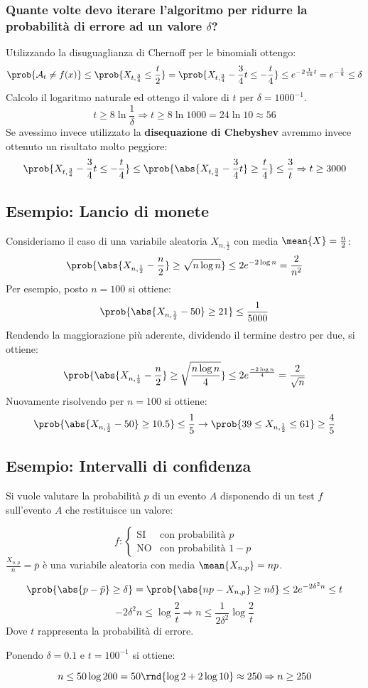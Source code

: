 \documentclass[\main/main.tex]{subfiles}
\begin{document}
\subsubsection{Quante volte devo iterare l'algoritmo per ridurre la probabilità di errore ad un valore \(\delta \)?}
Utilizzando la disuguaglianza di Chernoff per le binomiali ottengo:
\[
  \prob{\mathcal{A}_t \neq f(x)} \leq \prob{X_{t, \frac{3}{4}} \leq \frac{t}{2}} = \prob{X_{t,\frac{3}{4}} - \frac{3}{4}t \leq -\frac{t}{4}} \leq e^{-2\frac{1}{16}t} = e^{-\frac{1}{8}} \leq \delta
\]
Calcolo il logaritmo naturale ed ottengo il valore di \(t\) per \(\delta = 1000^{-1}\).
\[
  t \geq 8\ln{\frac{1}{\delta}} \Rightarrow t \geq 8 \ln{1000} = 24 \ln{10} \approx 56
\]
Se avessimo invece utilizzato la \textbf{disequazione di Chebyshev} avremmo invece ottenuto un risultato molto peggiore:
\[
  \prob{X_{t, \frac{3}{4}} - \frac{3}{4}t \leq -\frac{t}{4}} \leq \prob{\abs{X_{t, \frac{3}{4}} - \frac{3}{4}t} \geq \frac{t}{4}} \leq \frac{3}{t} \Rightarrow t \geq 3000
\]

\subsection{Esempio: Lancio di monete}
Consideriamo il caso di una variabile aleatoria \(X_{n, \frac{1}{2}}\) con media \(\mean{X} = \frac{n}{2}\):
\[
  \prob{\abs{X_{n, \frac{1}{2}} - \frac{n}{2}} \geq \sqrt{n\log{n}}} \leq 2e^{-2\log{n}} = \frac{2}{n^2}
\]
Per esempio, posto \(n=100\) si ottiene:
\[
  \prob{\abs{X_{n, \frac{1}{2}} - 50} \geq 21} \leq \frac{1}{5000}
\]
Rendendo la maggiorazione più aderente, dividendo il termine destro per due, si ottiene:
\[
  \prob{\abs{X_{n, \frac{1}{2}} - \frac{n}{2}} \geq \sqrt{\frac{n\log{n}}{4}}} \leq 2e^{\frac{-2\log{n}}{4}} = \frac{2}{\sqrt{n}}
\]
Nuovamente risolvendo per \(n=100\) si ottiene:
\[
  \prob{\abs{X_{n, \frac{1}{2}} - 50} \geq 10.5} \leq \frac{1}{5} \rightarrow \prob{39 \leq X_{n, \frac{1}{2}} \leq 61} \geq \frac{4}{5}
\]
\subsection{Esempio: Intervalli di confidenza}
Si vuole valutare la probabilità \(p\) di un evento \(A\) disponendo di un test \(f\) sull'evento \(A\) che restituisce un valore:

\[
  f: \begin{cases}
    \text{SI} & \text{con probabilità } p   \\
    \text{NO} & \text{con probabilità } 1-p
  \end{cases}
\]
\(\frac{X_{n,p}}{n} = \bar{p}\) è una variabile aleatoria con media \(\mean{X_{n,p}} = np\).

\[
  \prob{\abs{p-\bar{p}}\geq \delta} = \prob{\abs{np - X_{n,p}}\geq n\delta} \leq 2e^{-2\delta^2 n} \leq t
\]
\[
  -2\delta^2 n \leq \log{\frac{2}{t}} \Rightarrow n \leq \frac{1}{2\delta^2}\log{\frac{2}{t}}
\]
Dove \(t\) rappresenta la probabilità di errore.

Ponendo \(\delta = 0.1\) e \(t = 100^{-1}\) si ottiene:

\[
  n \leq 50\log{200} = 50\rnd{\log{2} + 2\log{10}} \approx 250 \Rightarrow n \geq 250
\]
\end{document}
